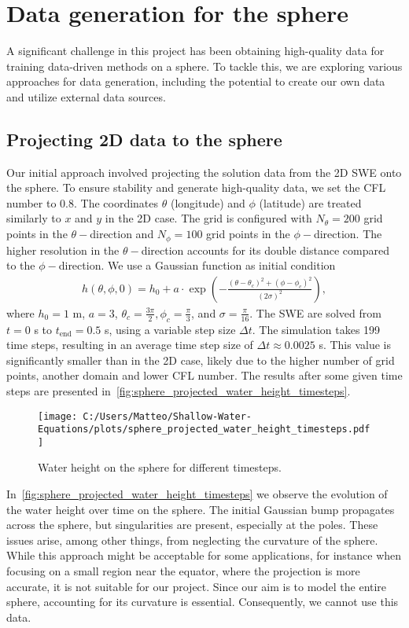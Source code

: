 \section{Data generation for the sphere}\label{sec:data_generation_sphere}
A significant challenge in this project has been obtaining high-quality data for training data-driven methods on a sphere.
To tackle this, we are exploring various approaches for data generation, including the potential to create our own data and utilize external data sources.


\subsection*{Projecting 2D data to the sphere}
Our initial approach involved projecting the solution data from the 2D SWE onto the sphere.
To ensure stability and generate high-quality data, we set the CFL number to 0.8.
The coordinates $\theta$ (longitude) and $\phi$ (latitude) are treated similarly to $x$ and $y$ in the 2D case.
The grid is configured with $N_{\theta} = 200$ grid points in the $\theta-$direction and $N_{\phi} = 100$ grid points in the $\phi-$direction.
The higher resolution in the $\theta-$direction accounts for its double distance compared to the $\phi-$direction.
We use a Gaussian function as initial condition
\begin{align*}
    h(\theta, \phi, 0) = h_0 + a \cdot \exp\left( -\frac{{(\theta - \theta_c)}^2 + {(\phi - \phi_c)}^2}{{(2\sigma)}^2} \right),
\end{align*}
where $h_0 = 1$ m, $a = 3$, $\theta_c = \frac{3 \pi}{2}, \phi_c = \frac{\pi}{3}$, and $\sigma = \frac{\pi}{16}$.
The SWE are solved from $t = 0$ s to $t_{\text{end}} = 0.5$ s, using a variable step size $\Delta t$.
The simulation takes 199 time steps, resulting in an average time step size of $\Delta t \approx 0.0025$ s.
This value is significantly smaller than in the 2D case, likely due to the higher number of grid points, another domain and lower CFL number.
The results after some given time steps are presented in~\autoref{fig:sphere_projected_water_height_timesteps}.
\begin{figure}[H]
    \centering
    \texttt{[image: C:/Users/Matteo/Shallow-Water-Equations/plots/sphere\_projected\_water\_height\_timesteps.pdf]}
    \caption{Water height on the sphere for different timesteps.}\label{fig:sphere_projected_water_height_timesteps}
\end{figure}
In~\autoref{fig:sphere_projected_water_height_timesteps} we observe the evolution of the water height over time on the sphere.
The initial Gaussian bump propagates across the sphere, but singularities are present, especially at the poles.
These issues arise, among other things, from neglecting the curvature of the sphere. 
While this approach might be acceptable for some applications, for instance when focusing on a small region near the equator, where the projection is more accurate, it is not suitable for our project.
Since our aim is to model the entire sphere, accounting for its curvature is essential.
Consequently, we cannot use this data.

